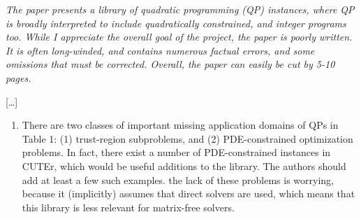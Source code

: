 \documentclass[11pt]{article}
\newcommand{\rep}[1]{{\textcolor{acblue}{#1}}}
\begin{document}
{\it
The paper presents a library of quadratic programming (QP) instances, where QP is broadly interpreted
to include quadratically constrained, and integer programs too. While I appreciate the overall goal of
the project, the paper is poorly written. It is often long-winded, and contains numerous factual errors,
and some omissions that must be corrected. Overall, the paper can easily be cut by 5-10 pages.
}

\rep{[\dots] }

{\it
\begin{enumerate}

\item There are two classes of important missing application domains of QPs in Table 1: (1) trust-region subproblems, and (2) PDE-constrained optimization problems. In fact, there exist a number of PDE-constrained instances in CUTEr, which would be useful additions to the library. The authors should add at least a few such examples. the lack of these problems is worrying, because
it (implicitly) assumes that direct solvers are used, which means that this library is less relevant for matrix-free solvers.


\end{enumerate}}
\end{document}
